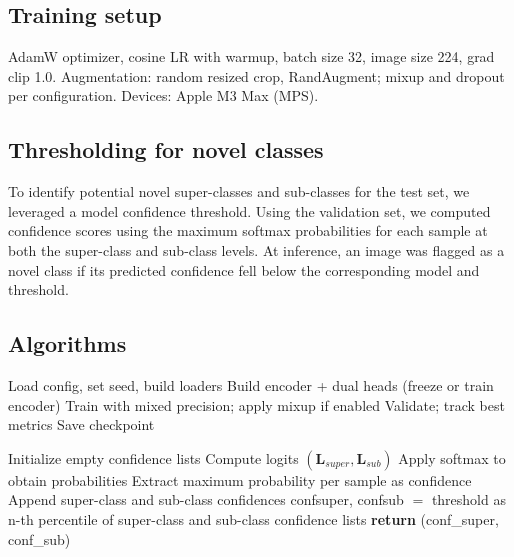 \documentclass{article}
\begin{document}
\subsection{Training setup}
AdamW optimizer, cosine LR with warmup, batch size 32, image size 224, grad clip 1.0. Augmentation: random resized crop, RandAugment; mixup and dropout per configuration. Devices: Apple M3 Max (MPS).

\subsection{Thresholding for novel classes}
To identify potential novel super-classes and sub-classes for the test set, we leveraged a model confidence threshold. Using the validation set, we computed confidence scores using the maximum softmax probabilities for each sample at both the super-class and sub-class levels. At inference, an image was flagged as a novel class if its predicted confidence fell below the corresponding model and threshold.

\subsection{Algorithms}
\begin{algorithm}[h]
\caption{Freeze vs.\ Finetune Sweep (per config)}
\begin{algorithmic}[1]
\STATE Load config, set seed, build loaders
\STATE Build encoder + dual heads (freeze or train encoder)
    \STATE Train with mixed precision; apply mixup if enabled
    \STATE Validate; track best metrics
    \STATE Save checkpoint
\ENDFOR
\end{algorithmic}

\end{algorithm}
\begin{algorithm}[H]
\caption{Novelty Threshold Computation (Super \& Sub Classes)}
\begin{algorithmic}[1]
\STATE Initialize empty confidence lists
    \STATE Compute logits $(\mathbf{L}_{super}, \mathbf{L}_{sub})$
    \STATE Apply softmax to obtain probabilities
    \STATE Extract maximum probability per sample as confidence
    \STATE Append super-class and sub-class confidences
\ENDFOR
\STATE confsuper, confsub $=$ threshold as n-th percentile of super-class and sub-class confidence lists
\STATE \textbf{return} (conf\_super, conf\_sub)
\end{algorithmic}
\end{algorithm}
\end{document}

